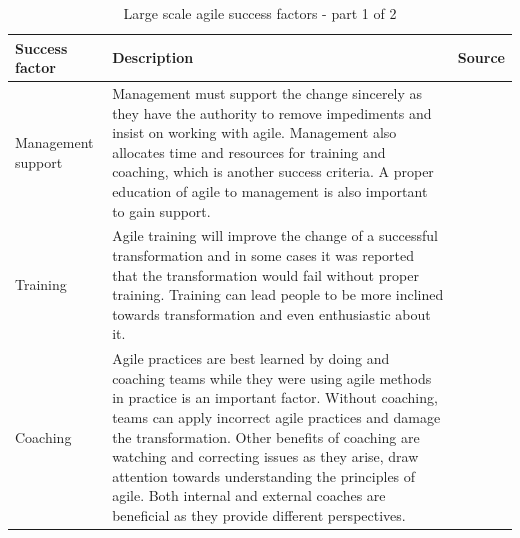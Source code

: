 \documentclass[11pt,a4paper]{report}
\begin{document}
\begin{table}[!ht]
\begin{tabular}{|p{4cm}|p{8cm}|p{1cm}|}
\hline
\textbf{Success factor} & \textbf{Description} & \textbf{Source} \\ \hline
Management support   & Management must support the change sincerely as they have the authority to remove impediments and insist on working with agile. Management also allocates time and resources for training and coaching, which is another success criteria. A proper education of agile to management is also important to gain support.  &    \cite{dikert2016challenges}     \\\hline
Training  & Agile training will improve the change of a successful transformation and in some cases it was reported that the transformation would fail without proper training. Training can lead people to be more inclined towards transformation and even enthusiastic about it.   &    \cite{dikert2016challenges}     \\\hline
Coaching   & Agile practices are best learned by doing and coaching teams while they were using agile methods in practice is an important factor. Without coaching, teams can apply incorrect agile practices and damage the transformation. Other benefits of coaching are watching and correcting issues as they arise, draw attention towards understanding the principles of agile. Both internal and external coaches are beneficial as they provide different perspectives.  &   \cite{dikert2016challenges}     \\\hline
\end{tabular}
\caption{Large scale agile success factors - part 1 of 2}
\label{LargeScaleAgileSuccessFactors}
\end{table}
\end{document}
